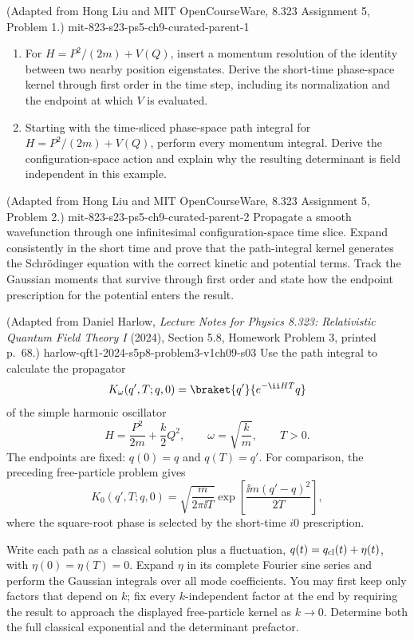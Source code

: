 
\begin{enumerate}
  {(Adapted from Hong Liu and MIT OpenCourseWare, 8.323 Assignment 5, Problem 1.)}
  {mit-823-s23-ps5-ch9-curated-parent-1}
\begin{enumerate}
\item
For \(H=P^2/(2m)+V(Q)\), insert a momentum resolution of the identity
between two nearby position eigenstates.  Derive the short-time
phase-space kernel through first order in the time step, including its
normalization and the endpoint at which \(V\) is evaluated.
\item
Starting with the time-sliced phase-space path integral for
\(H=P^2/(2m)+V(Q)\), perform every momentum integral.  Derive the
configuration-space action and explain why the resulting determinant is
field independent in this example.
\end{enumerate}

  {(Adapted from Hong Liu and MIT OpenCourseWare, 8.323 Assignment 5, Problem 2.)}
  {mit-823-s23-ps5-ch9-curated-parent-2}
Propagate a smooth wavefunction through one infinitesimal
configuration-space time slice.  Expand consistently in the short time and
prove that the path-integral kernel generates the Schrödinger equation with
the correct kinetic and potential terms.  Track the Gaussian moments that
survive through first order and state how the endpoint prescription for the
potential enters the result.

  {(Adapted from Daniel Harlow, \emph{Lecture Notes for Physics 8.323: Relativistic Quantum Field Theory I} (2024), Section 5.8, Homework Problem 3, printed p.~68.)}
  {harlow-qft1-2024-s5p8-problem3-v1ch09-s03}
Use the path integral to calculate the propagator
\[
 K_\omega(q',T;q,0)=\braket{q'}{e^{-\ii HT}q}
\]
of the simple harmonic oscillator
\[
 H=\frac{P^2}{2m}+\frac{k}{2}Q^2,
 \qquad \omega=\sqrt{\frac{k}{m}},
 \qquad T>0.
\]
The endpoints are fixed: \(q(0)=q\) and \(q(T)=q'\).  For comparison, the
preceding free-particle problem gives
\[
 K_0(q',T;q,0)
 =\sqrt{\frac{m}{2\pi \ii T}}
 \exp\left[\frac{\ii m(q'-q)^2}{2T}\right],
\]
where the square-root phase is selected by the short-time
\(i0\) prescription.

Write each path as a classical solution plus a fluctuation,
\(q(t)=q_{\rm cl}(t)+\eta(t)\), with
\(\eta(0)=\eta(T)=0\).  Expand \(\eta\) in its complete Fourier sine
series and perform the Gaussian integrals over all mode coefficients.
You may first keep only factors that depend on \(k\); fix every
\(k\)-independent factor at the end by requiring the result to approach
the displayed free-particle kernel as \(k\to0\).  Determine both the full
classical exponential and the determinant prefactor.


\end{enumerate}
